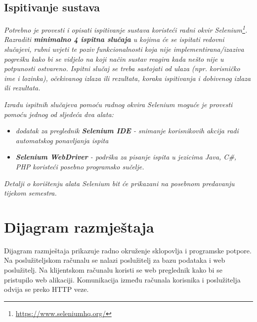 			
			
			\subsection{Ispitivanje sustava}
			
			 \textit{Potrebno je provesti i opisati ispitivanje sustava koristeći radni okvir Selenium\footnote{\url{https://www.seleniumhq.org/}}. Razraditi \textbf{minimalno 4 ispitna slučaja} u kojima će se ispitati redovni slučajevi, rubni uvjeti te poziv funkcionalnosti koja nije implementirana/izaziva pogrešku kako bi se vidjelo na koji način sustav reagira kada nešto nije u potpunosti ostvareno. Ispitni slučaj se treba sastojati od ulaza (npr. korisničko ime i lozinka), očekivanog izlaza ili rezultata, koraka ispitivanja i dobivenog izlaza ili rezultata.\\ }
			 
			 \textit{Izradu ispitnih slučajeva pomoću radnog okvira Selenium moguće je provesti pomoću jednog od sljedeća dva alata:}
			 \begin{itemize}
			 	\item \textit{dodatak za preglednik \textbf{Selenium IDE} - snimanje korisnikovih akcija radi automatskog ponavljanja ispita	}
			 	\item \textit{\textbf{Selenium WebDriver} - podrška za pisanje ispita u jezicima Java, C\#, PHP koristeći posebno programsko sučelje.}
			 \end{itemize}
		 	\textit{Detalji o korištenju alata Selenium bit će prikazani na posebnom predavanju tijekom semestra.}
			
			\eject 
		
		
		\section{Dijagram razmještaja}
			
			
			
			  \noindent Dijagram razmještaja prikazuje radno okruženje sklopovlja i programske potpore. Na poslužiteljskom računalu se nalazi poslužitelj za bazu podataka i web poslužitelj. Na klijentskom računalu koristi se web preglednik kako bi se pristupilo web alikaciji. Komunikacija između računala korisnika i poslužitelja odvija se preko HTTP veze.
			

